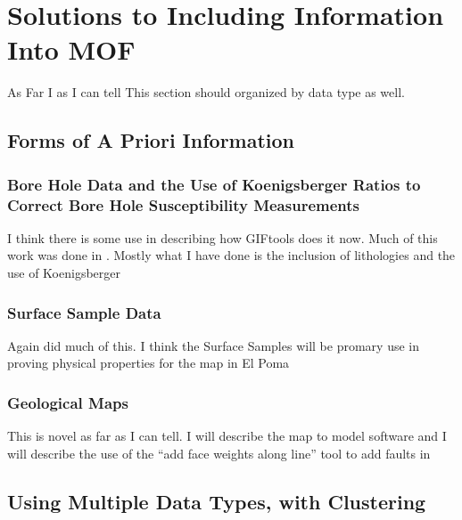 
\chapter{Solutions to Including Information Into \ac{MOF}}
\label{ch:Introduction}

\begin{epigraph}

\end{epigraph}

As Far I as I can tell This section should organized by data type as well.

\section{Forms of A Priori Information}
\label{sec:Forms of A Priori Information}

\subsection{Bore Hole Data and the Use of Koenigsberger Ratios to Correct Bore Hole Susceptibility Measurements}
\label{sec: Bore Hole Data}


I think there is some use in describing how GIFtools does it now. Much of this work was done in \cite{williams2008geologically}. Mostly what I have done is the inclusion of lithologies and the use of Koenigsberger
	
\subsection{Surface Sample Data}
\label{sec: Surface Sample Data}

Again \cite{williams2008geologically} did much of this. I think the Surface Samples will be promary use in proving physical properties for the map in El Poma


\subsection{Geological Maps}
\label{sec: Geological Maps}

This is novel as far as I can tell. I will describe the map to model software and I will describe the use of the ``add face weights along line'' tool to add faults in


\section{Using Multiple Data Types, with Clustering}
\label{sec:Using Multiple Data Types, with Clustering}

